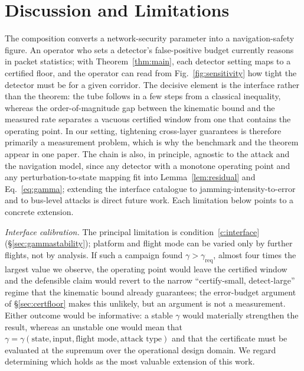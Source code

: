 \documentclass[conference,letterpaper,10pt]{IEEEtran}   %
\newcommand{\code}[1]{\texttt{#1}}
\begin{document}
\begin{table}[t]
\centering
\caption{Acquisition provenance across the ingested corpus. Counts come from
the schema-validated adapter outputs, and the split is machine-generated by
\code{experiments/provenance\_ledger.py} so the paper cannot drift from the
artifact. Acquisition is a property of the source; the strictly stronger
\code{pairing\_basis} distribution is discussed in the text.}
\label{tab:provenance}
\footnotesize
\renewcommand{\arraystretch}{1.05}

\end{table}

\section{Discussion and Limitations}
\label{sec:discussion}
\label{sec:limitations}
The composition converts a network-security parameter into a navigation-safety
figure. An operator who sets a detector's false-positive budget currently
reasons in packet statistics; with Theorem~\ref{thm:main}, each detector
setting maps to a certified floor, and the operator can read from
Fig.~\ref{fig:sensitivity} how tight the detector must be for a given corridor.
The decisive element is the interface rather than the theorem: the tube follows
in a few steps from a classical inequality, whereas the order-of-magnitude gap
between the kinematic bound and the measured rate separates a vacuous certified
window from one that contains the operating point. In our setting, tightening
cross-layer guarantees is therefore primarily a measurement problem, which is
why the benchmark and the theorem appear in one paper. The chain is also, in
principle, agnostic to the attack and the navigation model, since any detector with a monotone
operating point and any perturbation-to-state mapping fit into
Lemma~\ref{lem:residual} and Eq.~\eqref{eq:gamma}; extending the interface
catalogue to jamming-intensity-to-error and to bus-level attacks is direct
future work. Each limitation below points to a concrete extension.

\emph{Interface calibration.} The principal limitation is
condition~\ref{c:interface} (\S\ref{sec:gammastability}); platform and flight
mode can be varied only by further flights, not by analysis. If such a campaign
found $\gamma>\gamma_{\mathrm{req}}$, almost four times the largest value we
observe, the operating point would leave the certified window and the
defensible claim would revert to the narrow ``certify-small, detect-large''
regime that the kinematic bound already guarantees; the error-budget argument
of \S\ref{sec:certfloor} makes this unlikely, but an argument is not a
measurement. Either outcome would be informative: a stable
$\gamma$ would materially strengthen the result, whereas an unstable one would
mean that $\gamma=\gamma(\text{state},\text{input},\text{flight
mode},\text{attack type})$ and that the certificate must be evaluated at the
supremum over the operational design domain. We regard determining which holds
as the most valuable extension of this work.
\end{document}
